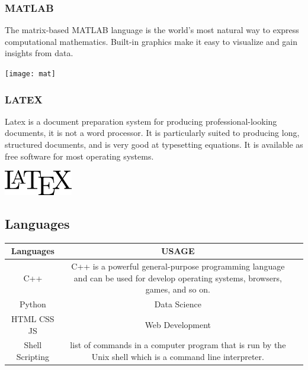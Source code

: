 \documentclass[11pt]{article}
\begin{document}
 \subsubsection{MATLAB}
 \hspace{1in} The matrix-based MATLAB language is the world’s most natural way to express computational mathematics. Built-in graphics make it easy to visualize and gain insights from data.
 
 \vspace{2cm}
 
\texttt{[image: mat]}
 
 \subsubsection{LATEX}
 \hspace{1in}Latex is a document preparation system for producing
professional-looking documents, it is not a word processor. It is particularly suited to producing long, structured documents, and is very good at typesetting equations. It is available as free software for most operating systems.

\vspace{2cm}



\includegraphics[width=30mm,scale=0.5]{latex}


\hspace{1in}\subsection{Languages}

\begin{center}

\begin{adjustbox}{width=\columnwidth,center}

\begin{tabular}{ | c | c | c | }

  \hline

  \textbf{Languages}& \textbf{USAGE}\\ \hline

  C++ & C++ is a powerful general-purpose programming language and can be used for develop operating systems, browsers, games, and so on.\\ \hline

  Python & Data Science  \\ \hline

  HTML CSS JS & Web Development\\ \hline

 Shell Scripting & list of commands in a computer program that is run by the Unix shell which is a command line interpreter.\\ \hline

  \end{tabular}

  \end{adjustbox}

\end{center}
\end{document}
